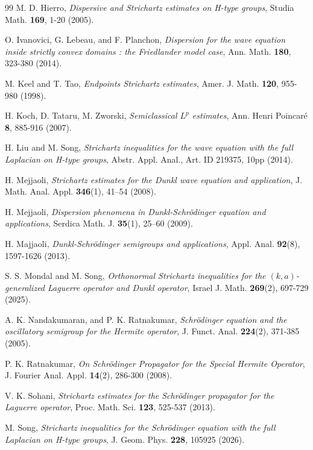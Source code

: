 \documentclass[a4paper,11pt, reqno]{amsart}
\numberwithin{equation}{section}
\theoremstyle{plain}
\theoremstyle{definition}
\theoremstyle{remark}
\begin{document}
\begin{thebibliography}{99}
\label{H2005} M. D. Hierro, \emph{Dispersive and Strichartz estimates on H-type groups}, Studia Math. \textbf{169}, 1-20 (2005).

 O. Ivanovici, G. Lebeau, and F. Planchon, \emph{Dispersion for the wave equation inside strictly convex domains \uppercase \expandafter {}: the Friedlander model case}, Ann. Math. \textbf{180}, 323-380 (2014).

\label{KT} M. Keel and  T. Tao, \emph{Endpoints Strichartz estimates}, Amer. J. Math. \textbf{120}, 955-980 (1998). 

 H. Koch, D. Tataru, M. Zworski, \emph{Semiclassical $L^p$ estimates}, Ann. Henri Poincar\'e \textbf{8}, 885-916 (2007).

 H. Liu and M. Song, \emph{Strichartz inequalities for the wave equation with the full Laplacian on H-type groups}, Abstr. Appl. Anal., Art. ID 219375, 10pp (2014).

 H. Mejjaoli, 
\emph{Strichartz estimates for the Dunkl wave equation and application},
J. Math. Anal. Appl. \textbf{346}(1), 41–54 (2008).

 H. Mejjaoli, \emph{Dispersion phenomena in Dunkl-Schr\"{o}dinger equation and applications},
Serdica Math. J. \textbf{35}(1), 25–60 (2009).

  H. Majjaoli,  \emph{Dunkl-Schr\"odinger semigroups and applications},  Appl. Anal. \textbf{92}(8), 1597-1626 (2013).

S. S. Mondal and  M. Song, \emph{Orthonormal Strichartz inequalities for the $(k,a)$-generalized Laguerre operator and Dunkl operator},  Israel J. Math. \textbf{269}(2), 697-729 (2025).  

\label{NR2005} A. K. Nandakumaran, and P. K. Ratnakumar, \emph{Schr\"{o}dinger equation and the oscillatory semigroup for the Hermite operator}, J. Funct. Anal. \textbf{224}(2), 371-385 (2005).

\label{R2008} P. K. Ratnakumar, \emph{On Schr\"{o}dinger Propagator for the Special Hermite Operator}, J. Fourier Anal. Appl. \textbf{14}(2), 286-300 (2008).

V. K. Sohani, \emph{Strichartz estimates for the Schr\"{o}dinger propagator for the Laguerre operator}, Proc. Math. Sci. \textbf{123}, 525-537 (2013).

 M. Song, \emph{Strichartz inequalities for the Schr\"odinger equation with the full Laplacian on H-type groups}, J. Geom. Phys. \textbf{228}, 105925 (2026).


\end{thebibliography}
\end{document}
